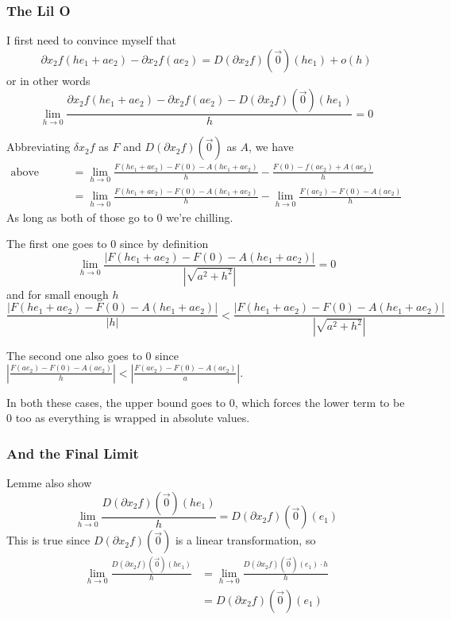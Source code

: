 \documentclass[12pt]{article}
\begin{document}
\subsubsection{The Lil O}

I first need to convince myself that
\[\partial x_2 f(he_1+ae_2)-\partial x_2 f(ae_2)
=D(\partial x_2 f)(\vec{0})(he_1)+o(h)\]
or in other words
\[\lim_{h \to 0} \frac{\partial x_2 f(he_1+ae_2)-\partial x_2 f(ae_2)-D(\partial x_2 f)(\vec{0})(he_1)}{h}=0\]

Abbreviating $\delta x_2 f$ as $F$ and $D(\partial x_2 f)(\vec{0})$ as $A$, we have
\begin{align*}
  \text{above limit}
  &= \lim_{h \to 0} \frac{F(he_1+ae_2)-F(0)-A(he_1+ae_2)}{h} - \frac{F(0)-f(ae_2)+A(ae_2)}{h} \\
  &= \lim_{h \to 0} \frac{F(he_1+ae_2)-F(0)-A(he_1+ae_2)}{h} - \lim_{h \to 0} \frac{F(ae_2)-F(0)-A(ae_2)}{h}
\end{align*}
As long as both of those go to $0$ we're chilling.

The first one goes to $0$ since by definition
\[\lim_{h \to 0} \frac{|F(he_1+ae_2)-F(0)-A(he_1+ae_2)|}{\left|\sqrt{a^2+h^2}\right|}=0\]
and for small enough $h$
\[\frac{|F(he_1+ae_2)-F(0)-A(he_1+ae_2)|}{\left|h\right|}
< \frac{|F(he_1+ae_2)-F(0)-A(he_1+ae_2)|}{\left|\sqrt{a^2+h^2}\right|}\]

The second one also goes to $0$ since
$\left|\frac{F(ae_2)-F(0)-A(ae_2)}{h}\right|
< \left|\frac{F(ae_2)-F(0)-A(ae_2)}{a}\right|$.

In both these cases, the upper bound goes to $0$, which forces the
lower term to be $0$ too as everything is wrapped in absolute values.

\subsubsection{And the Final Limit}

Lemme also show
\[\lim_{h \to 0} \frac{D(\partial x_2 f)(\vec{0})(he_1)}{h}
= D(\partial x_2 f)(\vec{0})(e_1)\]
This is true since $D(\partial x_2 f)(\vec{0})$ is a linear transformation, so
\begin{align*}
  \lim_{h \to 0} \frac{D(\partial x_2 f)(\vec{0})(he_1)}{h}
  &= \lim_{h \to 0} \frac{D(\partial x_2 f)(\vec{0})(e_1) \cdot h}{h} \\
  &= D(\partial x_2 f)(\vec{0})(e_1)
\end{align*}
\end{document}
